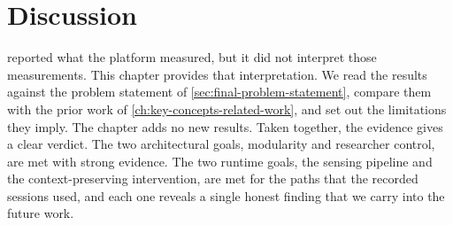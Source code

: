 \chapter{Discussion}
\label{ch:discussion}

%

 reported what the platform measured, but it did not interpret those measurements.
This chapter provides that interpretation.
We read the results against the problem statement of \cref{sec:final-problem-statement}, compare them with the prior work of \cref{ch:key-concepts-related-work}, and set out the limitations they imply.
The chapter adds no new results.
Taken together, the evidence gives a clear verdict.
The two architectural goals, modularity and researcher control, are met with strong evidence.
The two runtime goals, the sensing pipeline and the context-preserving intervention, are met for the paths that the recorded sessions used, and each one reveals a single honest finding that we carry into the future work.








